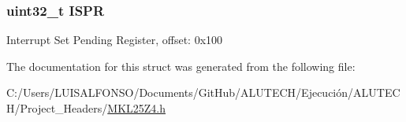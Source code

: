 \subsubsection[{I\+S\+P\+R}]{\setlength{\rightskip}{0pt plus 5cm}uint32\+\_\+t I\+S\+P\+R}\label{struct_n_v_i_c___mem_map_a9948e5816be3cb53ef9d27229eaf2d84}
Interrupt Set Pending Register, offset\+: 0x100 

The documentation for this struct was generated from the following file\+:\begin{DoxyCompactItemize}
\item 
C\+:/\+Users/\+L\+U\+I\+S\+A\+L\+F\+O\+N\+S\+O/\+Documents/\+Git\+Hub/\+A\+L\+U\+T\+E\+C\+H/\+Ejecución/\+A\+L\+U\+T\+E\+C\+H/\+Project\+\_\+\+Headers/\hyperlink{_m_k_l25_z4_8h}{M\+K\+L25\+Z4.\+h}\end{DoxyCompactItemize}
